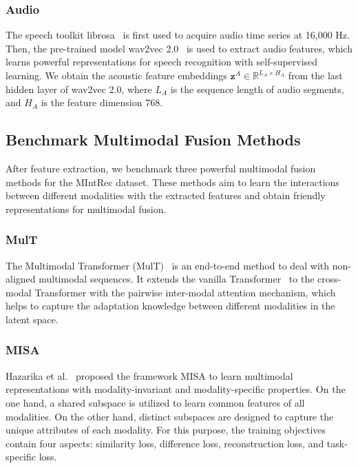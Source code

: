 \documentclass[sigconf,camera-ready]{acmart}
\begin{document}
\subsubsection{Audio}
The speech toolkit librosa~\cite{mcfee2015librosa}  is first used to acquire audio time series at 16,000 Hz. Then, the pre-trained model wav2vec 2.0~\cite{baevski2020wav2vec}   is used to extract audio features, which learns powerful representations for speech recognition with self-supervised learning. We obtain the acoustic feature embeddings $\mathbf{z}^{A} \in \mathds R^{L_{A} \times H_{A}}$ from the last hidden layer of wav2vec 2.0, where $L_{A}$ is the sequence length of audio segments, and $H_{A}$ is the feature dimension 768.

\subsection{Benchmark Multimodal Fusion Methods}
\label{benchmark}
After feature extraction, we benchmark three powerful multimodal fusion methods for the MIntRec dataset. These methods aim to learn the interactions between different modalities with the extracted features and obtain friendly representations for multimodal fusion. 

\subsubsection{MulT}
The Multimodal Transformer (MulT)~\cite{tsai2019multimodal} is an end-to-end method to deal with non-aligned multimodal sequences. It extends the vanilla Transformer~\cite{Transformer} to the cross-modal Transformer with the pairwise inter-modal attention mechanism, which helps to capture the adaptation knowledge between different modalities in the latent space.

\subsubsection{MISA}
Hazarika et al.~\cite{hazarika2020misa} proposed the framework MISA to learn multimodal representations with modality-invariant and modality-specific properties. On the one hand, a shared subspace is utilized to learn common features of all modalities. On the other hand, distinct subspaces are designed to capture the unique attributes of each modality. For this purpose, the training objectives contain four aspects: similarity loss, difference loss,  reconstruction loss, and task-specific loss.
\end{document}
